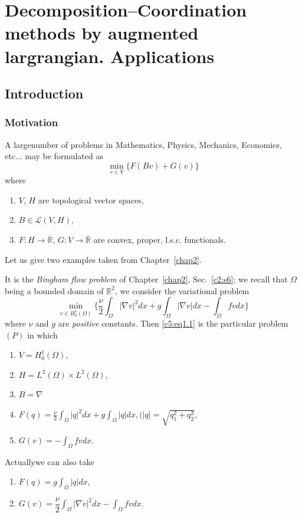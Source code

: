 
\chapter[Decomposition--Coordination methods by
  augmented...]{Decomposition--Coordination methods by augmented
  largrangian. Applications\protect
  \footnotemark[1]{}}\label{chap5} 

\section{Introduction}\label{c5:s1}

\subsection{Motivation}\label{c5:ss1.1}
A large\pageoriginale number of problems in Mathematics, Physics, Mechanics, Economics,  etc... may be formulated as 
\begin{equation}
\min_{v \in V} \{F(Bv) + G(v) \} \tag{P}
\end{equation}
where 
\begin{enumerate}[-]
\item $V$, $H$ are topological vector spaces,
\item $B \in \mathscr{L}(V, H)$,
\item $F : H \to \overline{\mathbb{R}}$, $G : V \to
  \overline{\mathbb{R}}$ are convex, proper, l.s.c. functionals. 
\end{enumerate}
Let us give two examples taken from Chapter~\ref{chap2}.

\begin{example}\label{c5:exa1}%
It is the {\em Bingham flow problem} of Chapter~\ref{chap2}, 
Sec.~\ref{c2:s6}; we recall that $\Omega$ being a bounded domain of 
$\mathbb{R}^2$, we consider the variational problem   
\begin{equation}
\min_{v \in H^1_0(\Omega)} \{\frac{\nu}{2} \int_\Omega |\nabla v |^2 dx + g \int_\Omega  | \nabla v | dx - \int_\Omega fv dx\} \tag{1.1}\label{c5:eq1.1}
\end{equation}
where $\nu$ and $g$ are {\em positive} constants. Then \eqref{c5:eq1.1} is the particular problem $(P)$ in which
\begin{enumerate}[-]
\item  $V = H^1_0(\Omega)$,
\item  $H = L^2(\Omega) \times L^2(\Omega)$,
\item $B = \nabla$
\item $F(q) = \frac{\nu}{2} \int_\Omega |q|^2 dx + g \int_\Omega |q| dx, (|q| = \sqrt{q^2_1 + q^2_2}$,
\item $G(v) = - \int_\Omega fv dx$.
\end{enumerate}
Actually\pageoriginale  we can also take
\begin{enumerate}[-]
\item  $F(q) = g \int_\Omega |q|dx$,
\item $G(v) = \dfrac{\nu}{2}\int_\Omega  |\nabla v |^2 dx- \int _\Omega fv dx$.
\end{enumerate}
\end{example}

